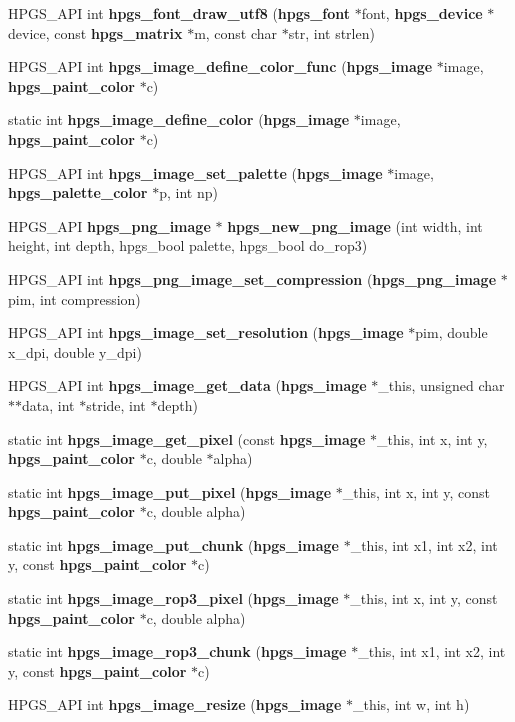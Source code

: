 \begin{DoxyCompactItemize}
HPGS\_\-API int {\bf hpgs\_\-font\_\-draw\_\-utf8} ({\bf hpgs\_\-font} $\ast$font, {\bf hpgs\_\-device} $\ast$device, const {\bf hpgs\_\-matrix} $\ast$m, const char $\ast$str, int strlen)
\item 
HPGS\_\-API int {\bf hpgs\_\-image\_\-define\_\-color\_\-func} ({\bf hpgs\_\-image} $\ast$image, {\bf hpgs\_\-paint\_\-color} $\ast$c)
\item 
static int {\bf hpgs\_\-image\_\-define\_\-color} ({\bf hpgs\_\-image} $\ast$image, {\bf hpgs\_\-paint\_\-color} $\ast$c)
\item 
HPGS\_\-API int {\bf hpgs\_\-image\_\-set\_\-palette} ({\bf hpgs\_\-image} $\ast$image, {\bf hpgs\_\-palette\_\-color} $\ast$p, int np)
\item 
HPGS\_\-API {\bf hpgs\_\-png\_\-image} $\ast$ {\bf hpgs\_\-new\_\-png\_\-image} (int width, int height, int depth, hpgs\_\-bool palette, hpgs\_\-bool do\_\-rop3)
\item 
HPGS\_\-API int {\bf hpgs\_\-png\_\-image\_\-set\_\-compression} ({\bf hpgs\_\-png\_\-image} $\ast$pim, int compression)
\item 
HPGS\_\-API int {\bf hpgs\_\-image\_\-set\_\-resolution} ({\bf hpgs\_\-image} $\ast$pim, double x\_\-dpi, double y\_\-dpi)
\item 
HPGS\_\-API int {\bf hpgs\_\-image\_\-get\_\-data} ({\bf hpgs\_\-image} $\ast$\_\-this, unsigned char $\ast$$\ast$data, int $\ast$stride, int $\ast$depth)
\item 
static int {\bf hpgs\_\-image\_\-get\_\-pixel} (const {\bf hpgs\_\-image} $\ast$\_\-this, int x, int y, {\bf hpgs\_\-paint\_\-color} $\ast$c, double $\ast$alpha)
\item 
static int {\bf hpgs\_\-image\_\-put\_\-pixel} ({\bf hpgs\_\-image} $\ast$\_\-this, int x, int y, const {\bf hpgs\_\-paint\_\-color} $\ast$c, double alpha)
\item 
static int {\bf hpgs\_\-image\_\-put\_\-chunk} ({\bf hpgs\_\-image} $\ast$\_\-this, int x1, int x2, int y, const {\bf hpgs\_\-paint\_\-color} $\ast$c)
\item 
static int {\bf hpgs\_\-image\_\-rop3\_\-pixel} ({\bf hpgs\_\-image} $\ast$\_\-this, int x, int y, const {\bf hpgs\_\-paint\_\-color} $\ast$c, double alpha)
\item 
static int {\bf hpgs\_\-image\_\-rop3\_\-chunk} ({\bf hpgs\_\-image} $\ast$\_\-this, int x1, int x2, int y, const {\bf hpgs\_\-paint\_\-color} $\ast$c)
\item 
HPGS\_\-API int {\bf hpgs\_\-image\_\-resize} ({\bf hpgs\_\-image} $\ast$\_\-this, int w, int h)
$$
\end{DoxyCompactItemize}
